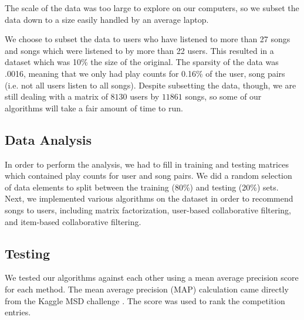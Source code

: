 \documentclass[11pt,preprint]{aastex}
\begin{document}
The scale of the data was too large to explore on our computers, so we subset the data down to a size easily handled by an average laptop. 

We choose to subset the data to users who have listened to more than 27 songs and songs which were listened to by more than 22 users. This resulted in a dataset which was 10\% the size of the original. The sparsity of the data was .0016, meaning that we only had play counts for 0.16\% of the user, song pairs (i.e. not all users listen to all songs). Despite subsetting the data, though, we are still dealing with a matrix of $8130$ users by $11861$ songs, so some of our algorithms will take a fair amount of time to run.



%
%


\subsection{Data Analysis}
In order to perform the analysis, we had to fill in training and testing matrices which contained play counts for user and song pairs. We did a random selection of data elements to split between the training (80\%) and testing (20\%) sets. Next, we implemented various algorithms on the dataset in order to recommend songs to users, including matrix factorization, user-based collaborative filtering, and item-based collaborative filtering.

\subsection{Testing}
We tested our algorithms against each other using a mean average precision 
score for each method.  The mean average precision (MAP) calculation came directly from the Kaggle MSD challenge \citep{McFee:2012:MSD:2187980.2188222}. The score was used to rank the competition entries.
\end{document}

